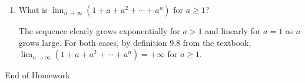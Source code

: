 \documentclass [10pt]{article}
\newcommand{\jg}[1]{{\color{blue} #1}}
\begin{document}
\begin{enumerate}
\begin{enumerate}
{For a more formal approach, we can look at section 10.3 of the textbook on page 59 where they show the following fact for a geometric sequence 
\begin{align*}
    \lim a(1 + r + r^2 + \cdots + r^n) = \frac{a}{r - 1} \quad \text{for} \quad |r| < 1. 
\end{align*}
Thus, we can compute the limit by substituting $a = 1$ and $r=\frac{1}{3}$, giving $\frac{1}{1 - (1/3)}$. Hence, the limit is $3/2$ as we approximated. 
}

\item What is $\lim_{n\to \infty}(1 + a + a^2 + \cdots + a^n)$ for $a\geq 1$?

\jg{
The sequence clearly grows exponentially for $a > 1$ and linearly for $a = 1$ as $n$ grows large. For both cases, by definition 9.8 from the textbook, $\lim_{n\to \infty}(1 + a + a^2 + \cdots + a^n) = + \infty$ for $a \geq 1$. 
}
\end{enumerate}
\end{enumerate}

\clearpage
\begin{center}
\vspace*{\fill}
{\Large End of Homework}
\vspace*{\fill}
\end{center}
\end{document}
